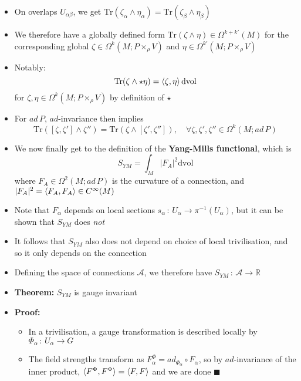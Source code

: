 \documentclass[12pt,a4paper]{article}
\numberwithin{equation}{section}
\begin{document}
\begin{itemize}
		\item On overlaps $U_{\alpha\beta}$, we get $\text{Tr}(\zeta_{\alpha}\wedge\eta_{\alpha})=\text{Tr}(\zeta_{\beta}\wedge\eta_{\beta})$
		\item We therefore have a globally defined form $\text{Tr}(\zeta\wedge\eta)\in\Omega^{k+k'}(M)$ for the corresponding global $\zeta\in\Omega^{k}(M;P\times_{\rho}V)$ and $\eta\in\Omega^{k'}(M;P\times_{\rho}V)$
		\item Notably:
		\begin{equation}
			\text{Tr}(\zeta\wedge\star\eta)=\braket{\zeta,\eta}\text{dvol}
		\end{equation}
		for $\zeta,\eta\in\Omega^{k}(M;P\times_{\rho}V)$ by definition of $\star$
		\item For $ad\,P$, $ad$-invariance then implies
		\begin{equation}
			\text{Tr}([\zeta,\zeta']\wedge\zeta'')=\text{Tr}(\zeta\wedge[\zeta',\zeta'']),\quad\forall\zeta,\zeta',\zeta''\in\Omega^{k}(M;ad\,P)
		\end{equation}
		\item We now finally get to the definition of the \textbf{Yang-Mills functional}, which is
		\begin{equation}
			S_{YM}=\int_{M}|F_{A}|^{2}\text{dvol}
		\end{equation}
		where $F_{A}\in\Omega^{2}(M;ad\,P)$ is the curvature of a connection, and $|F_{A}|^{2}=\braket{F_{A},F_{A}}\in C^{\infty}(M)$ 
		\item Note that $F_{\alpha}$ depends on local sections $s_{\alpha}\,:\,U_{\alpha}\to\pi^{-1}(U_{\alpha})$, but it can be shown that $S_{YM}$ does \emph{not}
		\item It follows that $S_{YM}$ also does not depend on choice of local trivilisation, and so it only depends on the connection
		\item Defining the space of connections $\mathcal{A}$, we therefore have $S_{YM}\,:\,\mathcal{A}\to\mathbb{R}$
		\item \textbf{Theorem:} $S_{YM}$ is gauge invariant
		\item \textbf{Proof:}
		\begin{itemize}
			\item In a trivilisation, a gauge transformation is described locally by $\Phi_{\alpha}\,:\,U_{\alpha}\to G$
			\item The field strengths transform as $F_{\alpha}^{\Phi}=ad_{\Phi_{\alpha}}\circ F_{\alpha}$, so by $ad$-invariance of the inner product, $\braket{F^{\Phi},F^{\Phi}}=\braket{F,F}$ and we are done $\blacksquare$

\end{itemize}
\end{itemize}
\end{document}
